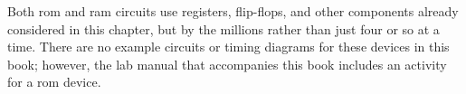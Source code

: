Both \gls{rom} and \gls{ram} circuits use registers, flip-flops, and other components already considered in this chapter, but by the millions rather than just four or so at a time. There are no example circuits or timing diagrams for these devices in this book; however, the lab manual that accompanies this book includes an activity for a \gls{rom} device.

















